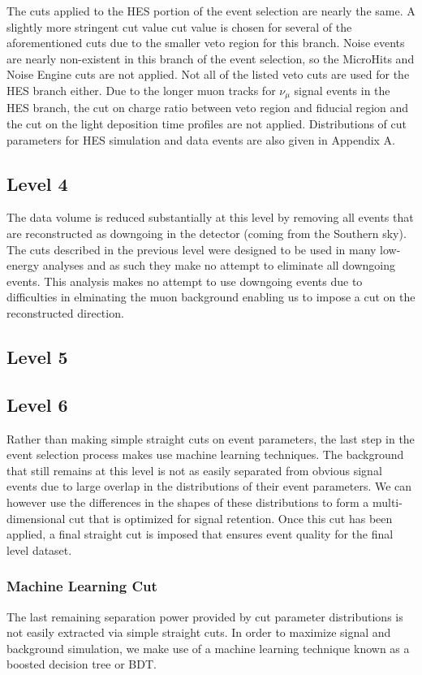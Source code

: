 \documentclass{gatech-thesis}
\begin{document}
The cuts applied to the HES portion of the event selection are nearly the same. A slightly more stringent cut value cut value is chosen for several of the aforementioned cuts due to the smaller veto region for this branch. Noise events are nearly non-existent in this branch of the event selection, so the MicroHits and Noise Engine cuts are not applied. Not all of the listed veto cuts are used for the HES branch either. Due to the longer muon tracks for $\nu_{\mu}$ signal events in the HES branch, the cut on charge ratio between veto region and fiducial region and the cut on the light deposition time profiles are not applied. Distributions of cut parameters for HES simulation and data events are also given in Appendix A.

\subsection{Level 4}
The data volume is reduced substantially at this level by removing all events that are reconstructed as downgoing  in the detector (coming from the Southern sky). The cuts described in the previous level were designed to be used in many low-energy analyses and as such they make no attempt to eliminate all downgoing events. This analysis makes no attempt to use downgoing events due to difficulties in elminating the muon background enabling us to impose a cut on the reconstructed direction.

\subsection{Level 5}

\subsection{Level 6}
Rather than making simple straight cuts on event parameters, the last step in the event selection process makes use machine learning techniques. The background that still remains at this level is not as easily separated from obvious signal events due to large overlap in the distributions of their event parameters. We can however use the differences in the shapes of these distributions to form a multi-dimensional cut that is optimized for signal retention. Once this cut has been applied, a final straight cut is imposed that ensures event quality for the final level dataset.
\subsubsection{Machine Learning Cut}
The last remaining separation power provided by cut parameter distributions is not easily extracted via simple straight cuts. In order to maximize signal and background simulation, we make use of a machine learning technique known as a boosted decision tree or BDT.
\end{document}
